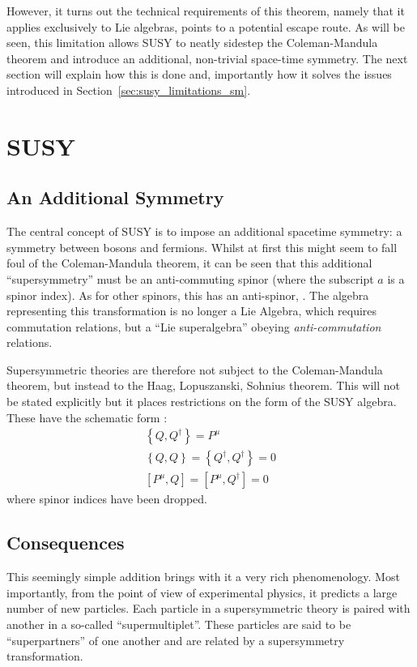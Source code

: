 However, it turns out the technical requirements of this theorem, namely that it
applies exclusively to Lie algebras, points to a potential escape route. As will
be seen, this limitation allows \acl{SUSY} to neatly sidestep the
Coleman-Mandula theorem and introduce an additional, non-trivial space-time
symmetry. The next section will explain how this is done and, importantly how it
solves the issues introduced in Section~\ref{sec:susy_limitations_sm}.

\section{\acl{SUSY}}
\subsection{An Additional Symmetry}
The central concept of \ac{SUSY} is to impose an additional spacetime symmetry:
a symmetry between bosons and fermions. Whilst at first this might seem to fall
foul of the Coleman-Mandula theorem, it can be seen that this additional
``supersymmetry'' must be an anti-commuting spinor \Qa (where the subscript $a$
is a spinor index). As for other spinors, this has an anti-spinor, \AQa. The
algebra representing this transformation is no longer a Lie Algebra, which
requires commutation relations, but a ``Lie superalgebra'' obeying
\emph{anti-commutation} relations.

Supersymmetric theories are therefore not subject to the Coleman-Mandula
theorem, but instead to the Haag, Lopuszanski, Sohnius theorem. This will not be
stated explicitly but it places restrictions on the form of the \ac{SUSY}
algebra. These have the schematic form \cite{susy_primer}:
\begin{eqnarray}
\left\{Q,Q^{\dagger}\right\} = P^{\mu}\\
\left\{Q,Q\right\} = \left\{Q^{\dagger}, Q^{\dagger}\right\} = 0\\
\left[P^{\mu}, Q\right] = \left[P^{\mu}, Q^{\dagger}\right] = 0\label{eqn:susy_commutator}
\end{eqnarray}
where spinor indices have been dropped.

\subsection{Consequences}
\label{sec:consequences}
This seemingly simple addition brings with it a very rich phenomenology. Most
importantly, from the point of view of experimental physics, it predicts a large
number of new particles. Each particle in a supersymmetric theory is paired with
another in a so-called ``supermultiplet''. These particles are said to be
``superpartners'' of one another and are related by a supersymmetry
transformation.

